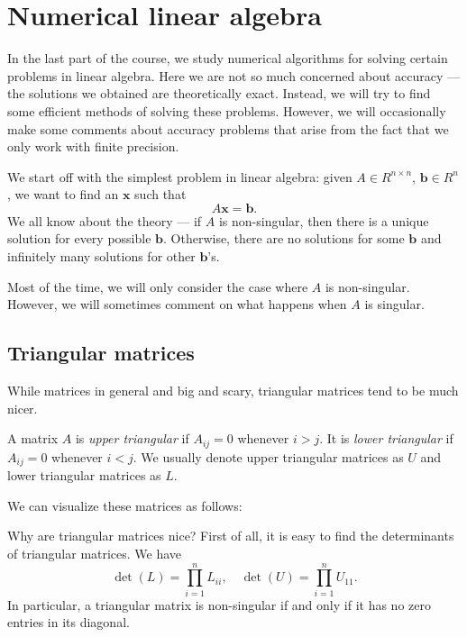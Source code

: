\documentclass[a4paper]{article}
\begin{document}
\section{Numerical linear algebra}
In the last part of the course, we study numerical algorithms for solving certain problems in linear algebra. Here we are not so much concerned about accuracy --- the solutions we obtained are theoretically exact. Instead, we will try to find some efficient methods of solving these problems. However, we will occasionally make some comments about accuracy problems that arise from the fact that we only work with finite precision.

We start off with the simplest problem in linear algebra: given $A \in R^{n \times n}$, $\mathbf{b} \in R^n$, we want to find an $\mathbf{x}$ such that
\[
  A\mathbf{x} = \mathbf{b}.
\]
We all know about the theory --- if $A$ is non-singular, then there is a unique solution for every possible $\mathbf{b}$. Otherwise, there are no solutions for some $\mathbf{b}$ and infinitely many solutions for other $\mathbf{b}$'s.

Most of the time, we will only consider the case where $A$ is non-singular. However, we will sometimes comment on what happens when $A$ is singular.

\subsection{Triangular matrices}
While matrices in general and big and scary, triangular matrices tend to be much nicer.
\begin{defi}
  A matrix $A$ is \emph{upper triangular} if $A_{ij} = 0$ whenever $i > j$. It is \emph{lower triangular} if $A_{ij} = 0$ whenever $i < j$. We usually denote upper triangular matrices as $U$ and lower triangular matrices as $L$.
\end{defi}
We can visualize these matrices as follows:
\begin{center}
\end{center}
Why are triangular matrices nice? First of all, it is easy to find the determinants of triangular matrices. We have
\[
  \det(L) = \prod_{i = 1}^n L_{ii},\quad \det(U) = \prod_{i = 1}^n U_{11}.
\]
In particular, a triangular matrix is non-singular if and only if it has no zero entries in its diagonal.
\end{document}
